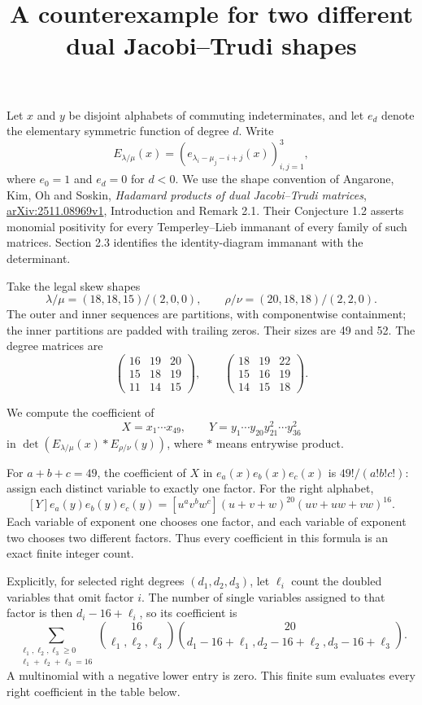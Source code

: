 \documentclass[11pt]{article}
\title{A counterexample for two different dual Jacobi–Trudi shapes}
\author{}
\date{}
\begin{document}
\maketitle

Let \(x\) and \(y\) be disjoint alphabets of commuting indeterminates, and let \(e_d\) denote the elementary symmetric function of degree \(d\). Write
\[
E_{\lambda/\mu}(x)=(e_{\lambda_i-\mu_j-i+j}(x))_{i,j=1}^3,
\]
where \(e_0=1\) and \(e_d=0\) for \(d<0\). We use the shape convention of Angarone, Kim, Oh and Soskin, \emph{Hadamard products of dual Jacobi–Trudi matrices}, \href{https://arxiv.org/html/2511.08969v1}{arXiv:2511.08969v1}, Introduction and Remark 2.1. Their Conjecture 1.2 asserts monomial positivity for every Temperley–Lieb immanant of every family of such matrices. Section 2.3 identifies the identity-diagram immanant with the determinant.

Take the legal skew shapes
\[
\lambda/\mu=(18,18,15)/(2,0,0),\qquad
\rho/\nu=(20,18,18)/(2,2,0).
\]
The outer and inner sequences are partitions, with componentwise containment; the inner partitions are padded with trailing zeros. Their sizes are 49 and 52. The degree matrices are
\[
\begin{pmatrix}16&19&20\\15&18&19\\11&14&15\end{pmatrix},\qquad
\begin{pmatrix}18&19&22\\15&16&19\\14&15&18\end{pmatrix}.
\]

We compute the coefficient of
\[
X=x_1\cdots x_{49},\qquad
Y=y_1\cdots y_{20}y_{21}^2\cdots y_{36}^2
\]
in \(\det(E_{\lambda/\mu}(x)*E_{\rho/\nu}(y))\), where \(*\) means entrywise product.

For \(a+b+c=49\), the coefficient of \(X\) in \(e_a(x)e_b(x)e_c(x)\) is \(49!/(a!b!c!)\): assign each distinct variable to exactly one factor. For the right alphabet,
\[
[Y]e_a(y)e_b(y)e_c(y)
=[u^av^bw^c](u+v+w)^{20}(uv+uw+vw)^{16}.
\]
Each variable of exponent one chooses one factor, and each variable of exponent two chooses two different factors. Thus every coefficient in this formula is an exact finite integer count.

Explicitly, for selected right degrees \((d_1,d_2,d_3)\), let \(\ell_i\) count the doubled variables that omit factor \(i\). The number of single variables assigned to that factor is then \(d_i-16+\ell_i\), so its coefficient is
\[
\sum_{\substack{\ell_1,\ell_2,\ell_3\ge0\\\ell_1+\ell_2+\ell_3=16}}
\binom{16}{\ell_1,\ell_2,\ell_3}
\binom{20}{d_1-16+\ell_1,d_2-16+\ell_2,d_3-16+\ell_3}.
\]
A multinomial with a negative lower entry is zero. This finite sum evaluates every right coefficient in the table below.
\end{document}
